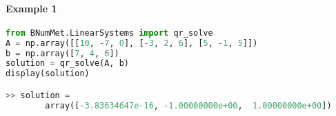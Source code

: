 \paragraph{Example 1}{
\begin{lstlisting}[language=Python]
from BNumMet.LinearSystems import qr_solve
A = np.array([[10, -7, 0], [-3, 2, 6], [5, -1, 5]])
b = np.array([7, 4, 6])
solution = qr_solve(A, b)
display(solution)

>> solution = 
        array([-3.83634647e-16, -1.00000000e+00,  1.00000000e+00])
\end{lstlisting}
}